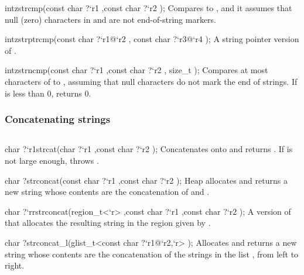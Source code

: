 \begin{defun2}{int}{zstrcmp}{(const char {?}`r1 ,const char {?}`r2 );}
  Compares  to , and it assumes that null (zero)
  characters in  and  are not end-of-string markers.
\end{defun2}

\begin{defun2}{int}{zstrptrcmp}{(const char {?}`r1@`r2 , const char {?}`r3@`r4 );}
  A string pointer version of .
\end{defun2}

\begin{defun2}{int}{zstrncmp}{(const char {?}`r1 ,const char {?}`r2 , size_t );}
  Compares at most  characters of  to ,
  assuming that null characters do not mark the end of strings.  If
   is less than 0,  returns 0.
\end{defun2}

\subsubsection*{Concatenating strings}

\begin{verbatim}
\end{verbatim}

\begin{defun2}{char {?}`r1}{strcat}{(char {?}`r1 ,const char {?}`r2 );}
  Concatenates  onto  and returns .
  If  is not large enough,  throws
  .
\end{defun2}

\begin{defun2}{char ?}{strconcat}{(const char {?}`r1 ,const char {?}`r2 );}
  Heap allocates and returns a new string whose contents are the
  concatenation of  and .
\end{defun2}

\begin{defun2}{char {?}`r}{rstrconcat(region_t<`r> ,const char {?}`r1 ,const char {?}`r2 );}
  A version of  that allocates the resulting string in
  the region given by .
\end{defun2}

\begin{defun2}{char ?}{strconcat_l}{(glist_t<const char {?}`r1@`r2,`r> );}
  Allocates and returns a new string whose contents are the
  concatenation of the strings in the list , from left to
  right.
\end{defun2}

